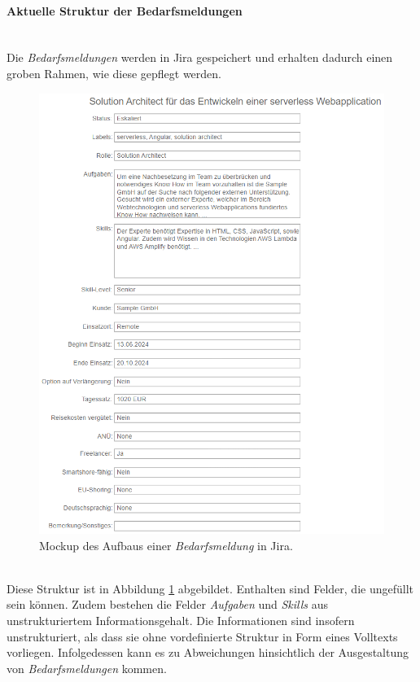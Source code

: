 \paragraph{Aktuelle Struktur der Bedarfsmeldungen}\mbox{} \\
Die \emph{Bedarfsmeldungen} werden in Jira gespeichert und erhalten dadurch einen groben Rahmen, wie diese gepflegt werden.
\begin{figure}[H]%
	\centering  
	\includegraphics[scale=1]{Abbildungen/jiraBefore.png}
	\caption{Mockup des Aufbaus einer \emph{Bedarfsmeldung} in Jira.}
	\label{fig:jirabefore}
\end{figure}\mbox{} \\
Diese Struktur ist in Abbildung \ref{fig:jirabefore} abgebildet. Enthalten sind Felder, die ungefüllt sein können. Zudem bestehen die Felder \emph{Aufgaben} und \emph{Skills} aus unstrukturiertem Informationsgehalt. Die Informationen sind insofern unstrukturiert, als dass sie ohne vordefinierte Struktur in Form eines Volltexts vorliegen. Infolgedessen kann es zu Abweichungen hinsichtlich der Ausgestaltung von \emph{Bedarfsmeldungen} kommen.\\
